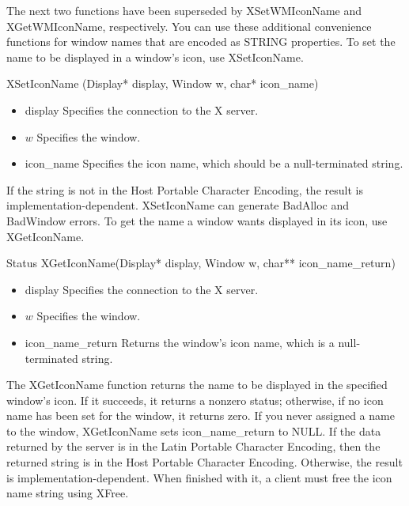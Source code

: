 \documentclass{report}
\begin{document}
\begin{itemize}
\begin{itemize}
            \bigbreak \noindent 
            The next two functions have been superseded by XSetWMIconName and XGetWMIconName, respectively. You can use these additional convenience functions for window names that are encoded as STRING properties.
            \bigbreak \noindent 
            To set the name to be displayed in a window’s icon, use XSetIconName.
            \bigbreak \noindent 
            \begin{cppcode}
            XSetIconName (Display* display, Window w, char* icon_name)
            \end{cppcode}
            \bigbreak \noindent
            \begin{itemize}
                \item display Specifies the connection to the X server.
                \item $w$ Specifies the window.
                \item icon\_name Specifies the icon name, which should be a null-terminated string.
            \end{itemize}
            If the string is not in the Host Portable Character Encoding, the result is implementation-dependent. XSetIconName can generate BadAlloc and BadWindow errors.
            \bigbreak \noindent 
            To get the name a window wants displayed in its icon, use XGetIconName.
            \bigbreak \noindent 
            \begin{cppcode}
            Status XGetIconName(Display* display, Window w, char** icon_name_return)
            \end{cppcode}
            \bigbreak \noindent
            \begin{itemize}
                \item display Specifies the connection to the X server.
                \item $w$ Specifies the window.
                \item icon\_name\_return Returns the window’s icon name, which is a null-terminated string.
            \end{itemize}
            \bigbreak \noindent 
            The XGetIconName function returns the name to be displayed in the specified window’s icon. If it succeeds, it returns a nonzero status; otherwise, if no icon name has been set for the window, it returns zero. If you never assigned a name to the window, XGetIconName sets icon\_name\_return to NULL. If the data returned by the server is in the Latin Portable Character Encoding, then the returned string is in the Host Portable Character Encoding. Otherwise, the result is implementation-dependent. When finished with it, a client must free the icon name string using XFree.

\end{itemize}
\end{itemize}
\end{document}

